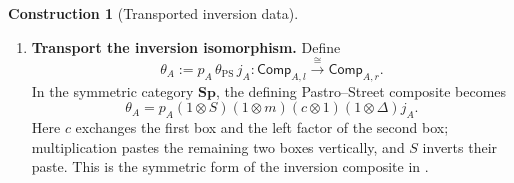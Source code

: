 \documentclass[oneside]{article}
\newcommand{\Sp}{\mathbf{Sp}}
\theoremstyle{plain}
\theoremstyle{definition}
\newtheorem{construction}[theorem]{Construction}
\theoremstyle{remark}
\begin{document}
\begin{construction}[Transported inversion data]
\begin{enumerate}
        \item \textbf{Transport the inversion isomorphism.} Define
        \begin{equation}
            \theta_A
            :=
            p_A\,
            \theta_{\mathrm{PS}}\,
            j_A:
            \mathsf{Comp}_{A,l}
            \xrightarrow{\cong}
            \mathsf{Comp}_{A,r}.
            \label{eq:cgqg-transported-theta}
        \end{equation}
        In the symmetric category \(\Sp\), the defining
        Pastro--Street composite becomes
        \begin{equation}
          \theta_A
          =p_A(1\otimes S)(1\otimes m)(c\otimes1)
             (1\otimes\Delta)j_A.
          \label{eq:cgqg-explicit-theta-composite}
        \end{equation}
        Here \(c\) exchanges the first box and the left factor of the
        second box; multiplication pastes the remaining two boxes
        vertically, and \(S\) inverts their paste. This is the symmetric
        form of the inversion composite in
        \cite[\S6, p.~182]{PastroStreet2009}.
    \end{enumerate}
\end{construction}
\end{document}
